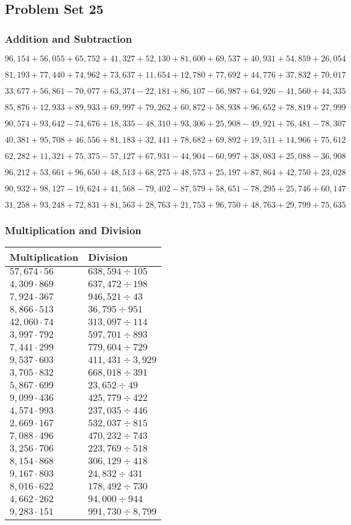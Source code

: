 \hypertarget{problem-set-25-4}{%
\subsection{Problem Set 25}\label{problem-set-25-4}}

\hypertarget{addition-and-subtraction-247}{%
\subsubsection{Addition and
Subtraction}\label{addition-and-subtraction-247}}

\(96,154+56,055+65,752+41,327+52,130+81,600+69,537+40,931+54,859+ 26,054\)

\(81,193+77,440+74,962+73,637+11,654+12,780+77,692+44,776+37,832+70,017\)

\(33,677+56,861-70,077+63,374-22,181+86,107-66,987+64,926-41,560+44,335\)

\(85,876+12,933+89,933+69,997+79,262+60,872+58,938+96,652+78,819+27,999\)

\(90,574+93,642-74,676+18,335-48,310+93,306+25,908-49,921+76,481-78,307\)

\(40,381+95,708+46,556+81,183+32,441+78,682+69,892+19,511+14,966+75,612\)

\(62,282+11,321+75,375-57,127+67,931-44,904-60,997+38,083+25,088-36,908\)

\(96,212+53,661+96,650+48,513+68,275+48,573+25,197+87,864+42,750+23,028\)

\(90,932+98,127-19,624+41,568-79,402-87,579+58,651-78,295+25,746+60,147\)

\(31,258+93,248+72,831+81,563+28,763+21,753+96,750+48,763+29,799+75,635\)

\hypertarget{multiplication-and-division-246}{%
\subsubsection{Multiplication and
Division}\label{multiplication-and-division-246}}

\begin{longtable}[]{@{}ll@{}}
\toprule
Multiplication & Division\tabularnewline
\midrule
\endhead
\(57,674\cdot56\) & \(638,594÷105\)\tabularnewline
\(4,309\cdot869\) & \(637,472÷198\)\tabularnewline
\(7,924\cdot367\) & \(946,521÷43\)\tabularnewline
\(8,866\cdot513\) & \(36,795÷951\)\tabularnewline
\(42,060\cdot74\) & \(313,097÷114\)\tabularnewline
\(3,997\cdot792\) & \(597,701÷893\)\tabularnewline
\(7,441\cdot299\) & \(779,604÷729\)\tabularnewline
\(9,537\cdot603\) & \(411,431÷3,929\)\tabularnewline
\(3,705\cdot832\) & \(668,018÷391\)\tabularnewline
\(5,867\cdot699\) & \(23,652÷49\)\tabularnewline
\(9,099\cdot436\) & \(425,779÷422\)\tabularnewline
\(4,574\cdot993\) & \(237,035÷446\)\tabularnewline
\(2,669\cdot167\) & \(532,037÷815\)\tabularnewline
\(7,088\cdot496\) & \(470,232÷743\)\tabularnewline
\(3,256\cdot706\) & \(223,769÷518\)\tabularnewline
\(8,154\cdot868\) & \(306,129÷418\)\tabularnewline
\(9,167\cdot803\) & \(24,832÷431\)\tabularnewline
\(8,016\cdot622\) & \(178,492÷730\)\tabularnewline
\(4,662\cdot262\) & \(94,000÷944\)\tabularnewline
\(9,283\cdot151\) & \(991,730÷8,799\)\tabularnewline
\bottomrule
\end{longtable}

